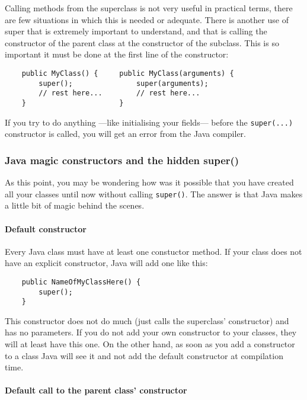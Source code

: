 {Calling methods from the superclass is not very useful in practical
terms, there are few situations in which this is needed or
adequate. There is another use of super that is extremely important to
understand, and that is calling the constructor of the parent class
at the constructor of the subclass. This is so important it must be
done at the first line of the constructor: 

\begin{verbatim}
    public MyClass() {     public MyClass(arguments) {
        super();               super(arguments);
        // rest here...        // rest here...    
    }                      }
\end{verbatim}

If you try to do anything ---like initialising your fields--- before
the \verb+super(...)+ constructor is called, you will get an error
from the Java compiler. 

\subsubsection*{Java magic constructors and the hidden super()}
\label{sec:hidden-super}

As this point, you may be wondering how was it possible that you have
created all your classes until now without calling \verb+super()+. The
answer is that Java makes a little bit of magic behind the scenes. 

\paragraph{Default constructor}
\label{sec:default-constructor}

Every Java class must have at least one constuctor method. If your
class does not have an explicit constructor, Java will add one like
this: 

\begin{verbatim}
    public NameOfMyClassHere() {
        super();
    }
\end{verbatim}

This constructor does not do much (just calls the superclass'
constructor) and has no parameters. If you do not add your own
constructor to your classes, they will at least have this one. On the
other hand, as soon as you add a constructor to a class Java will see
it and not add the default constructor at compilation time. 

\paragraph{Default call to the parent class' constructor}
\label{sec:default-call-parent}

}
